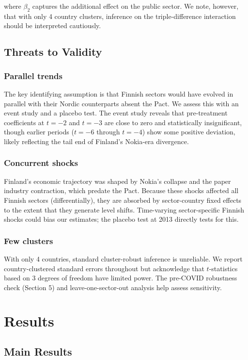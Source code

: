 \documentclass[12pt]{article}
\begin{document}
where $\beta_2$ captures the additional effect on the public sector. We note, however, that with only 4 country clusters, inference on the triple-difference interaction should be interpreted cautiously.

\subsection{Threats to Validity}

\subsubsection*{Parallel trends} The key identifying assumption is that Finnish sectors would have evolved in parallel with their Nordic counterparts absent the Pact. We assess this with an event study and a placebo test. The event study reveals that pre-treatment coefficients at $t = -2$ and $t = -3$ are close to zero and statistically insignificant, though earlier periods ($t = -6$ through $t = -4$) show some positive deviation, likely reflecting the tail end of Finland's Nokia-era divergence.

\subsubsection*{Concurrent shocks} Finland's economic trajectory was shaped by Nokia's collapse and the paper industry contraction, which predate the Pact. Because these shocks affected all Finnish sectors (differentially), they are absorbed by sector-country fixed effects to the extent that they generate level shifts. Time-varying sector-specific Finnish shocks could bias our estimates; the placebo test at 2013 directly tests for this.

\subsubsection*{Few clusters} With only 4 countries, standard cluster-robust inference is unreliable. We report country-clustered standard errors throughout but acknowledge that $t$-statistics based on 3 degrees of freedom have limited power. The pre-COVID robustness check (Section 5) and leave-one-sector-out analysis help assess sensitivity.


\section{Results}

\subsection{Main Results}
\end{document}
